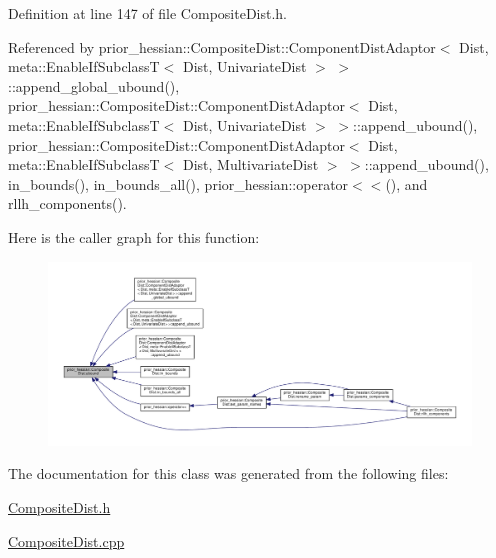 Definition at line 147 of file Composite\+Dist.\+h.



Referenced by prior\+\_\+hessian\+::\+Composite\+Dist\+::\+Component\+Dist\+Adaptor$<$ Dist, meta\+::\+Enable\+If\+Subclass\+T$<$ Dist, Univariate\+Dist $>$ $>$\+::append\+\_\+global\+\_\+ubound(), prior\+\_\+hessian\+::\+Composite\+Dist\+::\+Component\+Dist\+Adaptor$<$ Dist, meta\+::\+Enable\+If\+Subclass\+T$<$ Dist, Univariate\+Dist $>$ $>$\+::append\+\_\+ubound(), prior\+\_\+hessian\+::\+Composite\+Dist\+::\+Component\+Dist\+Adaptor$<$ Dist, meta\+::\+Enable\+If\+Subclass\+T$<$ Dist, Multivariate\+Dist $>$ $>$\+::append\+\_\+ubound(), in\+\_\+bounds(), in\+\_\+bounds\+\_\+all(), prior\+\_\+hessian\+::operator$<$$<$(), and rllh\+\_\+components().



Here is the caller graph for this function\+:\nopagebreak
\begin{figure}[H]
\begin{center}
\leavevmode
\includegraphics[width=350pt]{classprior__hessian_1_1CompositeDist_aab0290d9dd418c2e7deb26e9f37eb74f_icgraph}
\end{center}
\end{figure}




The documentation for this class was generated from the following files\+:\begin{DoxyCompactItemize}
\item 
\hyperlink{CompositeDist_8h}{Composite\+Dist.\+h}\item 
\hyperlink{CompositeDist_8cpp}{Composite\+Dist.\+cpp}\end{DoxyCompactItemize}
